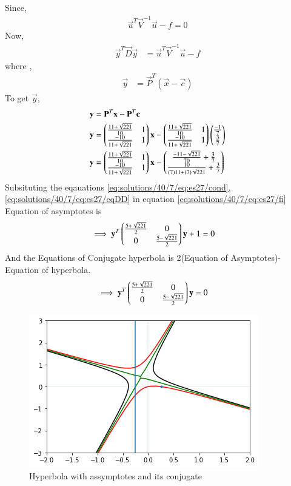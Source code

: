 Since,
\begin{align}
    \vec{u}^T\vec{V}^{-1}\vec{u}-f = 0\label{eq:solutions/40/7/eq:es27/cond}
\end{align} 
Now,
\begin{align}
    \vec{y}^T\vec{D}\vec{y}&=\vec{u}^T\vec{V}^{-1}\vec{u}-f\label{eq:solutions/40/7/eq:es27/fi}
\end{align}
where ,
\begin{align}
    \vec{y}&=\vec{P}^T(\vec{x}-\vec{c})
\end{align}
To get $\vec{y}$,
\begin{align}
\mathbf{y}&=\mathbf{P}^T\mathbf{x}-\mathbf{P}^T\mathbf{c}\\
    \mathbf{y}&= \begin{pmatrix}\frac{11+\sqrt{221}}{10} & 1 \\ \frac{-10}{11+\sqrt{221}} & 1\end{pmatrix}\mathbf{x}-\begin{pmatrix}\frac{11+\sqrt{221}}{10} & 1 \\ \frac{-10}{11+\sqrt{221}} & 1\end{pmatrix}\begin{pmatrix}\frac{-1}{7}\\\frac{3}{7}\end{pmatrix}\\
    \mathbf{y}&=\begin{pmatrix}\frac{11+\sqrt{221}}{10} & 1 \\ \frac{-10}{11+\sqrt{221}} & 1\end{pmatrix}\mathbf{x}-\begin{pmatrix}\frac{-11-\sqrt{221}}{70}+\frac{3}{7} \\ \frac{10}{(7)11+(7)\sqrt{221}}+\frac{3}{7}\end{pmatrix}
\end{align}
Subsituting the eqauations \eqref{eq:solutions/40/7/eq:es27/cond}, \eqref{eq:solutions/40/7/eq:es27/eqDD} in equation \eqref{eq:solutions/40/7/eq:es27/fi}
Equation of asymptotes is
\begin{align}
    \implies \mathbf{y}^T\begin{pmatrix}\frac{5+\sqrt{221}}{2} & 0 \\0 & \frac{5-\sqrt{221}}{2}\end{pmatrix}\mathbf{y}+1&=0
\end{align}
And the Equations of Conjugate hyperbola is 2(Equation of Asymptotes)- Equation of hyperbola. 
\begin{align}
    \implies \mathbf{y}^T\begin{pmatrix}\frac{5+\sqrt{221}}{2} & 0 \\0 & \frac{5-\sqrt{221}}{2}\end{pmatrix}\mathbf{y}&=0
\end{align}
\begin{figure}[h]
    \centering
    \includegraphics[width=\columnwidth]{./solutions/40/7/figs/A7_4.png}
    \caption{Hyperbola with assymptotes and its conjugate}
    \label{eq:solutions/40/7/Fig :1}
\end{figure}
